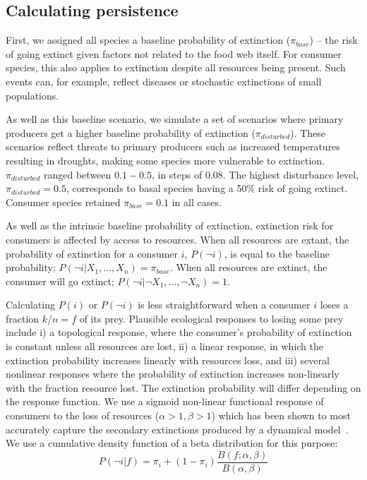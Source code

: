 \documentclass[12pt]{article}
\begin{document}
\begin{spacing}{2.0}
	\subsection*{Calculating persistence}	

		First, we assigned all species a baseline probability of extinction ($\pi_{base}$) -- the risk of going extinct given factors not related to the food web itself. 
		For consumer species, this also applies to extinction despite all resources being present. 
		Such events can, for example, reflect diseases or stochastic extinctions of small populations. 


		As well as this baseline scenario, we simulate a set of scenarios where primary producers get a higher baseline probability of extinction ($\pi_{disturbed}$). 
		These scenarios reflect threats to primary producers such as increased temperatures resulting in droughts, making some species more vulnerable to extinction.
		$\pi_{disturbed}$ ranged between $0.1-0.5$, in steps of $0.08$. The highest disturbance level, $\pi_{disturbed} = 0.5$, corresponds to basal species having a 50\% risk of going extinct. 
		Consumer species retained $\pi_{base}=0.1$ in all cases.
		
		
		As well as the intrinsic baseline probability of extinction, extinction risk for consumers is affected by access to resources. 
		When all resources are extant, the probability of extinction for a consumer $i$, $P(\lnot i)$, is equal to the baseline probability; $P(\lnot i|X_{1},...,X_{n}) = \pi_{base}$. 
		When all resources are extinct, the consumer will go extinct; $P(\lnot i|\lnot X_{1},...,\lnot X_{n})=1$. 

		Calculating $P(i)$ or $P(\lnot i)$ is less straightforward when a consumer $i$ loses a fraction $k/n = f$ of its prey. 
		Plausible ecological responses to losing some prey include i) a topological response, where the consumer's probability of extinction is constant unless all resources are lost, ii) a linear response, in which the extinction probability increases linearly with resources loss, and iii) several nonlinear responses where the probability of extinction increases non-linearly with the fraction resource lost. 
		The extinction probability will differ depending on the response function. 
		We use a sigmoid non-linear functional response of consumers to the loss of resources ($\alpha >1, \beta >1$) which has been shown to most accurately capture the secondary extinctions produced by a dynamical model~\citep{Eklof2013}. 
		We use a cumulative density function of a beta distribution for this purpose:
		\begin{equation}
		\label{betafunc}
		P(\lnot i|f) = \pi_{i} + (1 - \pi_{i}) \frac{B(f;\alpha,\beta)}{B(\alpha,\beta)}
		\end{equation}


\end{spacing}
\end{document}
